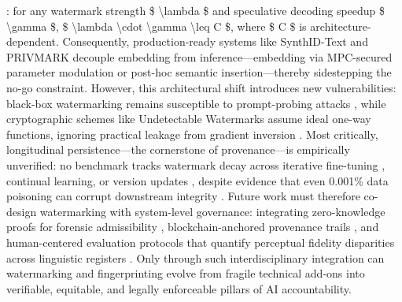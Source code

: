 \documentclass[11pt,a4paper]{article}
\begin{document}
\cite{doi:10.1038/s41586-024-08025-4}: for any watermark strength \$ \textbackslash{}lambda \$ and speculative decoding speedup \$ \textbackslash{}gamma \$, \$ \textbackslash{}lambda \textbackslash{}cdot \textbackslash{}gamma \textbackslash{}leq C \$, where \$ C \$ is architecture-dependent. Consequently, production-ready systems like SynthID-Text \cite{doi:10.1038/s41586-024-08025-4} and PRIVMARK \cite{doi:10.3390/info15110697} decouple embedding from inference---embedding via MPC-secured parameter modulation or post-hoc semantic insertion---thereby sidestepping the no-go constraint. However, this architectural shift introduces new vulnerabilities: black-box watermarking remains susceptible to prompt-probing attacks \cite{arxiv:2402.19361}, while cryptographic schemes like Undetectable Watermarks \cite{arxiv:2306.09194} assume ideal one-way functions, ignoring practical leakage from gradient inversion \cite{arxiv:2402.19361}. Most critically, longitudinal persistence---the cornerstone of provenance---is empirically unverified: no benchmark tracks watermark decay across iterative fine-tuning \cite{arxiv:2410.06467}, continual learning, or version updates \cite{doi:10.3389/fdata.2021.729663}, despite evidence that even 0.001\% data poisoning can corrupt downstream integrity \cite{doi:10.1038/s41591-024-03445-1}. Future work must therefore co-design watermarking with system-level governance: integrating zero-knowledge proofs for forensic admissibility \cite{doi:10.34190/iccws.19.1.2096}, blockchain-anchored provenance trails \cite{doi:10.34190/icair.4.1.3128}, and human-centered evaluation protocols that quantify perceptual fidelity disparities across linguistic registers \cite{doi:10.1145/3637528.3671467}. Only through such interdisciplinary integration can watermarking and fingerprinting evolve from fragile technical add-ons into verifiable, equitable, and legally enforceable pillars of AI accountability.
\end{document}
